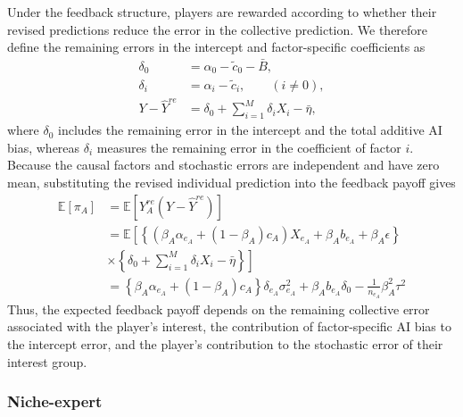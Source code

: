 \documentclass[12pt]{article}
\begin{document}
Under the feedback structure, players are rewarded according to whether their revised predictions reduce the error in the collective prediction. We therefore define the remaining errors in the intercept and factor-specific coefficients as
\begin{align}
\delta_0 &= \alpha_0 - \tilde{c}_0 - \bar{B},\\
\delta_i &= \alpha_i - \tilde{c}_i, \qquad (i\neq 0),\\
Y - \hat{Y}^{re} &= \delta_0 + \sum_{i = 1}^{M}\delta_iX_i - \bar{\eta},
\end{align}
where $\delta_0$ includes the remaining error in the intercept and the total additive AI bias, whereas $\delta_i$ measures the remaining error in the coefficient of factor $i$. 
Because the causal factors and stochastic errors are independent and have zero mean, substituting the revised individual prediction into the feedback payoff gives
\begin{align}
\mathbb{E}[\pi_A]
&= \mathbb{E}[Y_A^{re}(Y - \hat{Y}^{re})] \\
&= \mathbb{E}\left[\left\{\left(\beta_A\alpha_{e_A} + (1-\beta_A)c_A\right)X_{e_A} + \beta_Ab_{e_A} + \beta_A\epsilon\right\}\right.\\
&\times \left. \left\{\delta_0 + \sum_{i = 1}^{M}\delta_iX_i - \bar{\eta}\right\}\right] \\
&= \left\{\beta_A\alpha_{e_A} + (1-\beta_A)c_A\right\}\delta_{e_A}\sigma_{e_A}^2 + \beta_Ab_{e_A}\delta_0 - \frac{1}{n_{e_A}}\beta_A^2\tau^2
\end{align}
Thus, the expected feedback payoff depends on the remaining collective error associated with the player's interest, the contribution of factor-specific AI bias to the intercept error, and the player's contribution to the stochastic error of their interest group.

\subsubsection*{Niche-expert}
\end{document}
